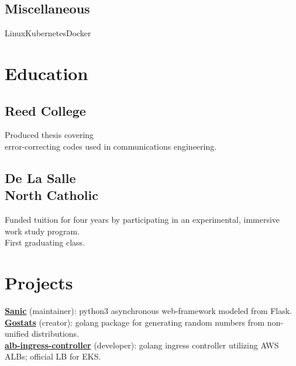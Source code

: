 \documentclass[]{deemweaver}
\begin{document}
\begin{minipage}[t]{0.32\textwidth}
\subsection{Miscellaneous}
Linux\textbullet{}Kubernetes\textbullet{}Docker


\section{Education}

\subsection{Reed College}
Produced thesis covering \\ error-correcting codes used in communications engineering.
\sectionsep

\subsection{De La Salle \protect\\ North Catholic}
Funded tuition for four years by participating in an experimental,
immersive work study program. \\First graduating class.
\sectionsep

\section{Projects}
\href{https://github.com/huge-success/sanic}{\bf Sanic} (maintainer): python3 asynchronous web-framework modeled from Flask.\\
\vspace{3pt}
\href{https://github.com/r0fls/gostats}{\bf Gostats} (creator): golang package for generating random numbers from non-unified distributions. \\
\vspace{3pt}
\href{https://github.com/kubernetes-sigs/aws-alb-ingress-controller}{\bf alb-ingress-controller} (developer): golang ingress controller utilizing AWS ALBs; official LB for EKS.

%
%

\end{minipage}
\end{document}
